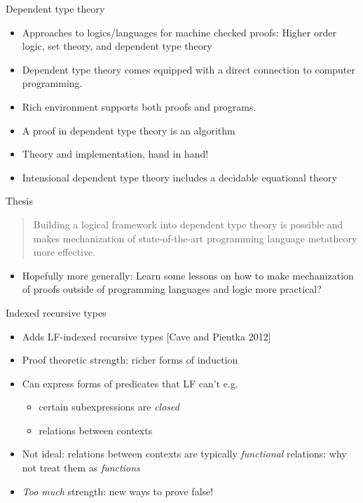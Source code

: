 \documentclass[usenames,dvipsnames]{beamer}
\begin{document}
\begin{frame}{Dependent type theory}
\begin{itemize}
\item Approaches to logics/languages for
machine checked proofs: Higher order logic, set theory, and dependent
type theory
\item Dependent type theory comes equipped with a direct
connection to computer programming.
\item Rich environment supports both proofs and
programs.
\item A proof in dependent type theory is an algorithm
\item Theory and implementation, hand in hand!
\item Intensional dependent type theory includes a decidable equational theory
\end{itemize}
\end{frame}

\begin{frame}{Thesis}
\begin{quote}Building a logical framework into dependent type
theory is possible and makes mechanization of state-of-the-art programming
language metatheory more effective.
\end{quote}
\begin{itemize}
\pause
\item Hopefully more generally: Learn some lessons on how
to make mechanization of proofs outside of programming languages and
logic more practical?
\end{itemize}
\end{frame}


\begin{frame}{Indexed recursive types}
\begin{itemize}
\item Adds LF-indexed recursive types [Cave and Pientka 2012]
\item Proof theoretic strength: richer forms of induction
\item Can express forms of predicates that LF can't e.g.
\begin{itemize}
\item certain subexpressions are \emph{closed}
\item relations between contexts
\end{itemize}
\item Not ideal: relations between contexts are typically \emph{functional} relations: why not treat them as \emph{functions}
\item \emph{Too much} strength: new ways to prove false!
\end{itemize}
\end{frame}
\end{document}
